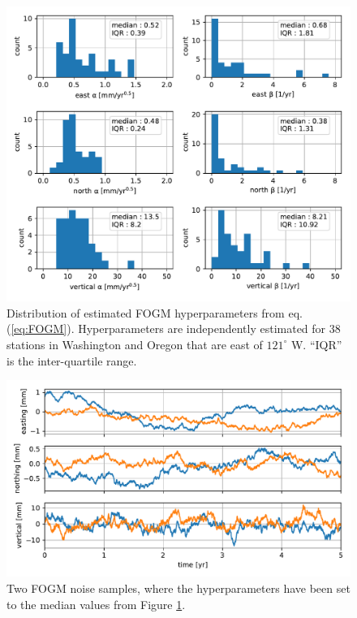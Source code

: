 \documentclass[10pt,letter]{article}
\begin{document}
\begin{figure}
\includegraphics{figures/noise/noise-params.pdf}
\caption{Distribution of estimated FOGM hyperparameters from eq. (\ref{eq:FOGM}).  Hyperparameters are independently estimated for 38 stations in Washington and Oregon that are east of $121^\circ$ W. ``IQR'' is the inter-quartile range.}   
\label{fig:NoiseParams}
\end{figure}

\begin{figure}
\includegraphics{figures/noise/noise-samples.pdf}
\caption{Two FOGM noise samples, where the hyperparameters have been set to the median values from Figure \ref{fig:NoiseParams}.}   
\label{fig:NoiseSamples}
\end{figure}
\end{document}
